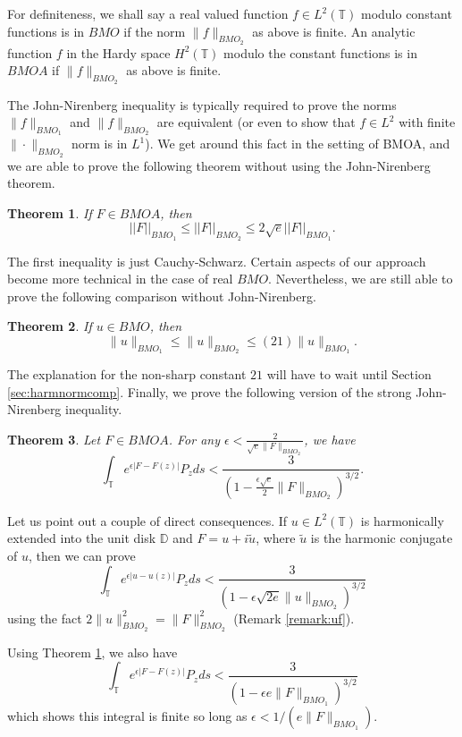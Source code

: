 \documentclass[12pt]{amsart}
\newtheorem{theorem}{Theorem}[section]
\theoremstyle{definition}
\theoremstyle{remark}
\numberwithin{equation}{section}
\newcommand{\D}{\mathbb{D}}
\newcommand{\T}{\mathbb{T}}
\begin{document}
For definiteness, we shall say a real valued function $f\in L^2(\T)$
modulo constant functions is in $BMO$ if the norm $\|f\|_{BMO_2}$ as
above is finite.  An analytic function $f$ in the Hardy space
$H^2(\T)$ modulo the constant functions is in $BMOA$ if $\|f\|_{BMO_2}$
as above is finite.

The John-Nirenberg inequality is typically required to prove the norms
$\|f\|_{BMO_1}$ and $\|f\|_{BMO_2}$ are equivalent (or even to show that $f
\in L^2$ with finite $\|\cdot\|_{BMO_2}$ norm is in $L^1$).  We get
around this fact in the setting of BMOA, and we are able to prove the
following theorem without using the John-Nirenberg theorem.  

\begin{theorem} \label{normcomparison} 
If $F \in BMOA$, then
\[
||F||_{BMO_1} \leq ||F||_{BMO_2} \leq 2\sqrt{e} ||F||_{BMO_1}.
\]
\end{theorem}

The first inequality is just Cauchy-Schwarz.  Certain aspects of our
approach become more technical in the case of real $BMO$.
Nevertheless, we are still able to prove the following comparison
without John-Nirenberg.

\begin{theorem} \label{normcomparisonharmonic}
If $u \in BMO$, then
\[
\|u\|_{BMO_1} \leq \|u\|_{BMO_2} \leq (21) \|u\|_{BMO_1}.
\]
\end{theorem}

The explanation for the non-sharp constant $21$ will have to wait
until Section \ref{sec:harmnormcomp}.
Finally, we prove the following version of the strong John-Nirenberg
inequality.

\begin{theorem} \label{johnnirenberg}
Let $F \in BMOA$.  For any $\epsilon < \frac{2}{\sqrt{e} \|F\|_{BMO_2}}$, we have
\[
\int_{\T} e^{\epsilon |F-F(z)|} P_z ds < \frac{3}{(1-\frac{\epsilon
    \sqrt{e}}{2} \|F\|_{BMO_2})^{3/2}}.
\]
\end{theorem}

Let us point out a couple of direct consequences.  If $u \in L^2(\T)$
is harmonically extended into the unit disk $\D$ and $F =
u+i\tilde{u}$, where $\tilde{u}$ is the harmonic conjugate of $u$,
then we can prove
\[
\int_{\T} e^{\epsilon |u-u(z)|} P_z ds < \frac{3}{(1-\epsilon
    \sqrt{2e} \|u\|_{BMO_2})^{3/2}}
\]
using the fact $2\|u\|^2_{BMO_2} = \|F\|^2_{BMO_2}$ (Remark
\ref{remark:uf}).

Using Theorem \ref{normcomparison}, we also have
\[
\int_{\T} e^{\epsilon |F-F(z)|} P_z ds < \frac{3}{(1-\epsilon e
  \|F\|_{BMO_1})^{3/2}}
\]
which shows this integral is finite so long as $\epsilon <
1/(e\|F\|_{BMO_1})$.
\end{document}
